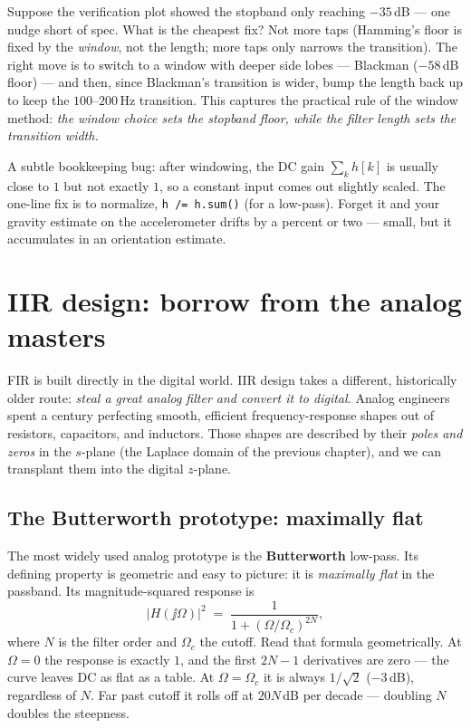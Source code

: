 \begin{walkbox}
Suppose the verification plot showed the stopband only reaching $-35$\,dB --- one
nudge short of spec. What is the cheapest fix? Not more taps (Hamming's floor is
fixed by the \emph{window}, not the length; more taps only narrows the
transition). The right move is to switch to a window with deeper side lobes ---
Blackman ($-58$\,dB floor) --- and then, since Blackman's transition is wider,
bump the length back up to keep the $100$--$200$\,Hz transition. This captures the
practical rule of the window method: \emph{the window choice sets the stopband
floor, while the filter length sets the transition width.}
\end{walkbox}

\begin{trapbox}
A subtle bookkeeping bug: after windowing, the DC gain $\sum_k h[k]$ is usually
close to $1$ but not exactly $1$, so a constant input comes out slightly scaled.
The one-line fix is to normalize, \texttt{h /= h.sum()} (for a low-pass). Forget
it and your gravity estimate on the accelerometer drifts by a percent or two ---
small, but it accumulates in an orientation estimate.
\end{trapbox}

\section{IIR design: borrow from the analog masters}
\label{ch16:iir}

FIR is built directly in the digital world. IIR design takes a different,
historically older route: \emph{steal a great analog filter and convert it to
digital.} Analog engineers spent a century perfecting smooth, efficient
frequency-response shapes out of resistors, capacitors, and inductors. Those
shapes are described by their \emph{poles and zeros} in the $s$-plane (the Laplace
domain of the previous chapter), and we can transplant them into the digital
$z$-plane.

\subsection{The Butterworth prototype: maximally flat}
\label{ch16:butterworth}

The most widely used analog prototype is the \textbf{Butterworth} low-pass. Its
defining property is geometric and easy to picture: it is \emph{maximally flat} in
the passband. Its magnitude-squared response is
\[
|H(\jj\Omega)|^2 \;=\; \frac{1}{1 + (\Omega/\Omega_c)^{2N}},
\]
where $N$ is the filter order and $\Omega_c$ the cutoff. Read that formula
geometrically. At $\Omega = 0$ the response is exactly $1$, and the first $2N-1$
derivatives are zero --- the curve leaves DC as flat as a table. At $\Omega =
\Omega_c$ it is always $1/\sqrt2$ ($-3$\,dB), regardless of $N$. Far past cutoff it
rolls off at $20N$\,dB per decade --- doubling $N$ doubles the steepness.

